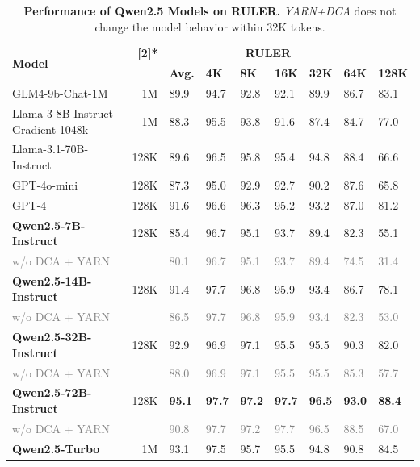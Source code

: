 \documentclass{article}
\begin{document}
\begin{table}[tbp]
\centering
\caption{\textbf{Performance of Qwen2.5 Models on RULER.} \textit{YARN+DCA} does not change the model behavior within 32K tokens.}
\label{tab:ruler}
\small
\begin{tabular}{@{}lrlllllll@{}}
\toprule
\multirow{2}{*}{\bf Model} & \bf \multirow{2}[2]{*}{\makecell{\bf Claimed \\ Length}} & \multicolumn{6}{c}{\bf RULER}  \\ 
\cmidrule{3-9}
 & &  \bf Avg.  & \bf 4K   & \bf 8K    & \bf 16K  & \bf 32K  & \bf 64K   & \bf 128K  \\ \midrule
 GLM4-9b-Chat-1M & 1M         & 89.9   & 94.7   & 92.8            & 92.1   & 89.9   & 86.7          & 83.1             \\
Llama-3-8B-Instruct-Gradient-1048k & 1M         & 88.3   & 95.5   & 93.8            & 91.6   & 87.4   & 84.7          & 77.0      \\
Llama-3.1-70B-Instruct & 128K & 89.6 & 96.5 & 95.8 &  95.4 & 94.8  & 88.4 &  66.6 \\
GPT-4o-mini    & 128K       & 87.3   & 95.0   & 92.9            & 92.7   & 90.2   & 87.6          & 65.8                \\ 
GPT-4        & 128K     & 91.6 & 96.6 & 96.3 & 95.2 & 93.2 & 87.0          & 81.2              \\ 
\midrule
\textbf{Qwen2.5-7B-Instruct}  & 128K & 85.4 & 96.7 & 95.1 &93.7 & 89.4&82.3&55.1\\
\textcolor{gray}{\quad w/o DCA + YARN} &  & \textcolor{gray}{80.1} & \textcolor{gray}{96.7} & \textcolor{gray}{95.1} & \textcolor{gray}{93.7} & \textcolor{gray}{89.4} &\textcolor{gray}{74.5}&\textcolor{gray}{31.4} \\
\textbf{Qwen2.5-14B-Instruct} & 128K & 91.4 &97.7 &96.8 &95.9 &93.4 & 86.7 & 78.1 \\
\quad \textcolor{gray}{w/o DCA + YARN} &  & \textcolor{gray}{86.5} & \textcolor{gray}{97.7} & \textcolor{gray}{96.8} & \textcolor{gray}{95.9} & \textcolor{gray}{93.4} & \textcolor{gray}{82.3} & \textcolor{gray}{53.0} \\
\textbf{Qwen2.5-32B-Instruct} & 128K & 92.9 & 96.9 & 97.1 & 95.5 & 95.5 & 90.3 & 82.0  \\
\quad \textcolor{gray}{w/o DCA + YARN} &  & \textcolor{gray}{88.0} & \textcolor{gray}{96.9} & \textcolor{gray}{97.1} & \textcolor{gray}{95.5} & \textcolor{gray}{95.5} & \textcolor{gray}{85.3} & \textcolor{gray}{57.7} \\
\textbf{Qwen2.5-72B-Instruct} & 128K & \bf95.1 & \bf97.7 & \bf 97.2 & \bf 97.7 & \bf 96.5 & \bf 93.0 & \bf 88.4 \\
\quad \textcolor{gray}{w/o DCA + YARN} &  & \textcolor{gray}{90.8} & \textcolor{gray}{97.7} & \textcolor{gray}{97.2} & \textcolor{gray}{97.7} & \textcolor{gray}{96.5} &  \textcolor{gray}{88.5} & \textcolor{gray}{67.0} \\
\midrule
\textbf{Qwen2.5-Turbo}  & 1M & {93.1} & {97.5} & 95.7 & {95.5} & {94.8} & {90.8} & {84.5} \\                 
\bottomrule
\end{tabular}
\end{table}
\end{document}
